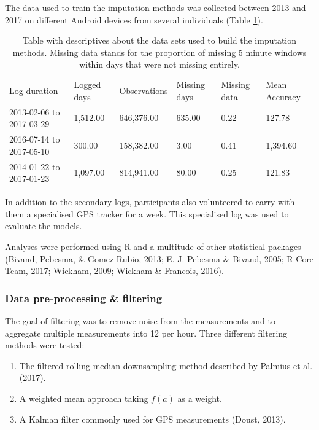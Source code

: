 \documentclass[english,man]{apa6}
\makeatletter
\newenvironment{lltable}
  {\begin{landscape}\begin{center}\begin{ThreePartTable}}
  {\end{ThreePartTable}\end{center}\end{landscape}}
\newcommand\LastLTentrywidth{1em}
\newlength\longtablewidth
\newcommand\getlongtablewidth{%
 \begingroup
  \ifcsname LT@\roman{LT@tables}\endcsname
  \global\longtablewidth=0pt
  \renewcommand\LT@entry[2]{\global\advance\longtablewidth by ##2\relax\gdef\LastLTentrywidth{##2}}%
  \@nameuse{LT@\roman{LT@tables}}%
  \fi
\endgroup}
\providecommand{\tightlist}{%
  \setlength{\itemsep}{0pt}\setlength{\parskip}{0pt}}
\theoremstyle{definition}
\theoremstyle{definition}
\theoremstyle{definition}
\theoremstyle{remark}
\makeatother
\begin{document}
The data used to train the imputation methods was collected between 2013
and 2017 on different Android devices from several individuals (Table
\ref{tab:datadetailsTable}).

\begin{lltable}
\begin{longtable}{llllll}\noalign{\getlongtablewidth\global\LTcapwidth=\longtablewidth}
\caption{\label{tab:datadetailsTable}Table with descriptives about the data sets used to build the imputation methods. Missing data stands for the proportion of missing 5 minute windows within days that were not missing entirely.}\\
\toprule
Log duration & Logged days & Observations & Missing
days & Missing
data & Mean Accuracy\\
\midrule
2013-02-06 to 2017-03-29 & 1,512.00 & 646,376.00 & 635.00 & 0.22 & 127.78\\
2016-07-14 to 2017-05-10 & 300.00 & 158,382.00 & 3.00 & 0.41 & 1,394.60\\
2014-01-22 to 2017-01-23 & 1,097.00 & 814,941.00 & 80.00 & 0.25 & 121.83\\
\bottomrule
\end{longtable}
\end{lltable}

In addition to the secondary logs, participants also volunteered to
carry with them a specialised GPS tracker for a week. This specialised
log was used to evaluate the models.

Analyses were performed using R and a multitude of other statistical
packages (Bivand, Pebesma, \& Gomez-Rubio, 2013; E. J. Pebesma \&
Bivand, 2005; R Core Team, 2017; Wickham, 2009; Wickham \& Francois,
2016).

\subsubsection{Data pre-processing \&
filtering}\label{data-pre-processing-filtering}

The goal of filtering was to remove noise from the measurements and to
aggregate multiple measurements into 12 per hour. Three different
filtering methods were tested:

\begin{enumerate}
\def\labelenumi{\arabic{enumi}.}
\tightlist
\item
  The filtered rolling-median downsampling method described by Palmius
  et al. (2017).
\item
  A weighted mean approach taking \(f(a)\) as a weight.
\item
  A Kalman filter commonly used for GPS measurements (Doust, 2013).
\end{enumerate}
\end{document}

